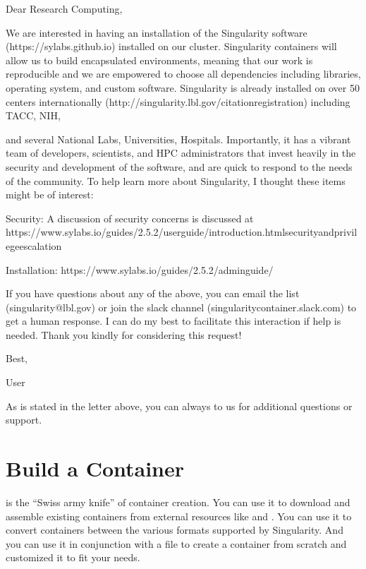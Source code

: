 \documentclass[letterpaper,10pt,english]{sphinxmanual}
\begin{document}
%
\begin{sphinxVerbatim}[commandchars=\\\{\}]
Dear Research Computing,


We are interested in having an installation of the Singularity software (https://sylabs.github.io) installed on our cluster. Singularity containers will allow us to build encapsulated environments, meaning that our work is reproducible and we are empowered to choose all dependencies including libraries, operating system, and custom software. Singularity is already installed on over 50 centers internationally (http://singularity.lbl.gov/citation\PYGZhy{}registration) including TACC, NIH,

and several National Labs, Universities, Hospitals. Importantly, it has a vibrant team of developers, scientists, and HPC administrators that invest heavily in the security and development of the software, and are quick to respond to the needs of the community. To help learn more about Singularity, I thought these items might be of interest:


  \PYGZhy{} Security: A discussion of security concerns is discussed at https://www.sylabs.io/guides/2.5.2/user\PYGZhy{}guide/introduction.html\PYGZsh{}security\PYGZhy{}and\PYGZhy{}privilege\PYGZhy{}escalation

  \PYGZhy{} Installation: https://www.sylabs.io/guides/2.5.2/admin\PYGZhy{}guide/


If you have questions about any of the above, you can email the list (singularity@lbl.gov) or join the slack channel (singularity\PYGZhy{}container.slack.com) to get a human response. I can do my best to facilitate this interaction if help is needed. Thank you kindly for considering this request!

Best,

User
\end{sphinxVerbatim}

As is stated in the letter above, you can always  to us for additional questions or support.


\chapter{Build a Container}
\label{\detokenize{build_a_container:build-a-container}}\label{\detokenize{build_a_container:id1}}\label{\detokenize{build_a_container::doc}}\label{\detokenize{build_a_container:sec-buildcontainer}}
 is the “Swiss army knife” of container creation. You can use it to
download and assemble existing containers from external resources like
 and . You can use it to convert
containers between the various formats supported by Singularity. And you
can use it in conjunction with a {\hyperref[\detokenize{container_recipes:container-recipes}]{}} file to
create a container from scratch and customized it to fit your needs.
\end{document}
